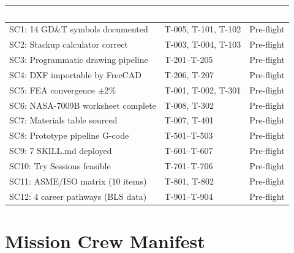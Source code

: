 \documentclass[11pt,letterpaper]{article}
\newcommand{\tableheader}[1]{\textbf{\sffamily\textcolor{white}{#1}}}
\begin{document}
\begin{center}
\begin{tabularx}{\textwidth}{L{4.5cm}L{5cm}C{2cm}}
\toprule
{}
\tableheader{Success Criterion} & \tableheader{Test IDs} & \tableheader{Status} \\
\midrule
SC1: 14 GD\&T symbols documented & T-005, T-101, T-102 & Pre-flight \\
SC2: Stackup calculator correct & T-003, T-004, T-103 & Pre-flight \\
SC3: Programmatic drawing pipeline & T-201--T-205 & Pre-flight \\
SC4: DXF importable by FreeCAD & T-206, T-207 & Pre-flight \\
SC5: FEA convergence $\pm$2\% & T-001, T-002, T-301 & Pre-flight \\
SC6: NASA-7009B worksheet complete & T-008, T-302 & Pre-flight \\
SC7: Materials table sourced & T-007, T-401 & Pre-flight \\
SC8: Prototype pipeline G-code & T-501--T-503 & Pre-flight \\
SC9: 7 SKILL.md deployed & T-601--T-607 & Pre-flight \\
SC10: Try Sessions feasible & T-701--T-706 & Pre-flight \\
SC11: ASME/ISO matrix (10 items) & T-801, T-802 & Pre-flight \\
SC12: 4 career pathways (BLS data) & T-901--T-904 & Pre-flight \\
\bottomrule
\end{tabularx}
\end{center}

\section{Mission Crew Manifest}
\end{document}
